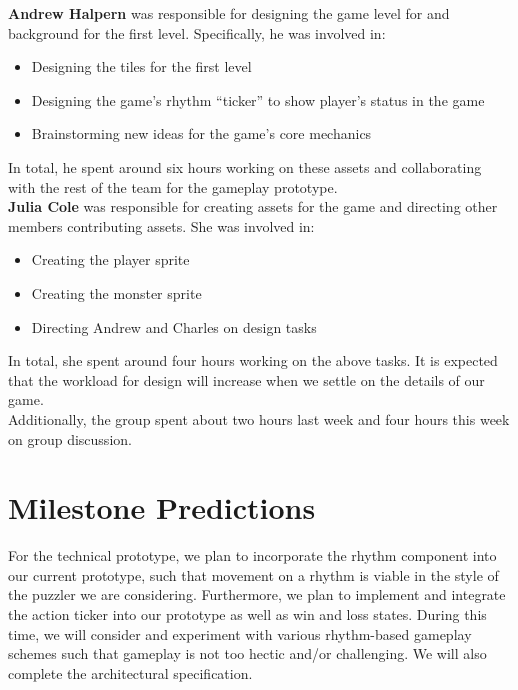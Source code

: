 \documentclass[]{article}
\begin{document}
\textbf{Andrew Halpern} 
was responsible for designing the game level for and 
background for the first level.
Specifically, he was involved in:
\begin{itemize}
\item Designing the tiles for the first level
\item Designing the game's rhythm ``ticker'' to show player's status in the game
\item Brainstorming new ideas for the game's core mechanics
\end{itemize}
In total, he spent around six hours working on these assets and 
collaborating with the rest of the team for the gameplay prototype. \\

\textbf{Julia Cole} 
was responsible for creating assets for the game and 
directing other members contributing assets. She was involved in:
\begin{itemize}
\item Creating the player sprite
\item Creating the monster sprite
\item Directing Andrew and Charles on design tasks
\end{itemize}
In total, she spent around four hours working on the above tasks. 
It is expected that the workload for design will increase when 
we settle on the details of our game. \\

Additionally, the group spent about two hours last week and 
four hours this week on group discussion.

\section*{Milestone Predictions}
For the technical prototype, we plan to incorporate the rhythm
component into our current prototype, such that movement on a rhythm
is viable in the style of the puzzler we are considering.
Furthermore, we plan to implement and integrate the action ticker into
our prototype as well as win and loss states.  During this time, we
will consider and experiment with various rhythm-based gameplay
schemes such that gameplay is not too hectic and/or challenging.  We
will also complete the architectural specification.
\end{document}

